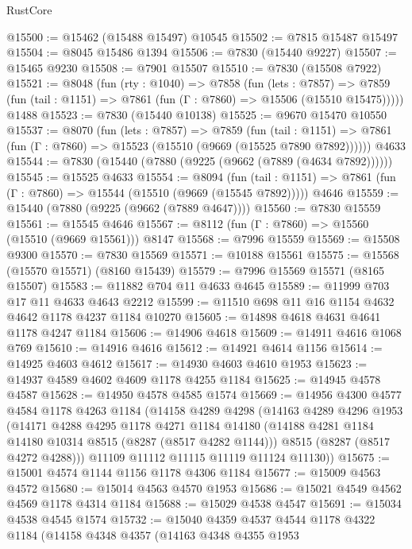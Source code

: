 \begin{lexlean}{RustCore}
\begin{coremodule}
@15500 := @15462 (@15488 @15497) @10545
@15502 := @7815 @15487 @15497
@15504 := @8045 @15486 @1394
@15506 := @7830 (@15440 @9227)
@15507 := @15465 @9230
@15508 := @7901 @15507
@15510 := @7830 (@15508 @7922)
@15521 := @8048
    (fun (rty : @1040) =>
    @7858
      (fun (lets : @7857) =>
      @7859 (fun (tail : @1151) => @7861 (fun (Γ : @7860) => @15506 (@15510 @15475)))))
    @1488
@15523 := @7830 (@15440 @10138)
@15525 := @9670 @15470 @10550
@15537 := @8070
    (fun (lets : @7857) =>
    @7859
      (fun (tail : @1151) =>
      @7861 (fun (Γ : @7860) => @15523 (@15510 (@9669 (@15525 @7890 @7892))))))
    @4633
@15544 := @7830 (@15440 (@7880 (@9225 (@9662 (@7889 (@4634 @7892))))))
@15545 := @15525 @4633
@15554 := @8094
    (fun (tail : @1151) => @7861 (fun (Γ : @7860) => @15544 (@15510 (@9669 (@15545 @7892)))))
    @4646
@15559 := @15440 (@7880 (@9225 (@9662 (@7889 @4647))))
@15560 := @7830 @15559
@15561 := @15545 @4646
@15567 := @8112 (fun (Γ : @7860) => @15560 (@15510 (@9669 @15561))) @8147
@15568 := @7996 @15559
@15569 := @15508 @9300
@15570 := @7830 @15569
@15571 := @10188 @15561
@15575 := @15568 (@15570 @15571) (@8160 @15439)
@15579 := @7996 @15569 @15571 (@8165 @15507)
@15583 := @11882 @704 @11 @4633 @4645
@15589 := @11999 @703 @17 @11 @4633 @4643 @2212
@15599 := @11510 @698 @11 @16 @1154 @4632 @4642 @1178 @4237 @1184 @10270
@15605 := @14898 @4618 @4631 @4641 @1178 @4247 @1184
@15606 := @14906 @4618
@15609 := @14911 @4616 @1068 @769
@15610 := @14916 @4616
@15612 := @14921 @4614 @1156
@15614 := @14925 @4603 @4612
@15617 := @14930 @4603 @4610 @1953
@15623 := @14937 @4589 @4602 @4609 @1178 @4255 @1184
@15625 := @14945 @4578 @4587
@15628 := @14950 @4578 @4585 @1574
@15669 := @14956
    @4300
    @4577
    @4584
    @1178
    @4263
    @1184
    (@14158
      @4289
      @4298
      (@14163
        @4289
        @4296
        @1953
        (@14171
          @4288
          @4295
          @1178
          @4271
          @1184
          @14180
          (@14188 @4281 @1184 @14180 @10314 @8515 (@8287 (@8517 @4282 @1144)))
          @8515
          (@8287 (@8517 @4272 @4288)))
        @11109
        @11112
        @11115
        @11119
        @11124
        @11130))
@15675 := @15001 @4574 @1144 @1156 @1178 @4306 @1184
@15677 := @15009 @4563 @4572
@15680 := @15014 @4563 @4570 @1953
@15686 := @15021 @4549 @4562 @4569 @1178 @4314 @1184
@15688 := @15029 @4538 @4547
@15691 := @15034 @4538 @4545 @1574
@15732 := @15040
    @4359
    @4537
    @4544
    @1178
    @4322
    @1184
    (@14158
      @4348
      @4357
      (@14163
        @4348
        @4355
        @1953

\end{coremodule}
\end{lexlean}
